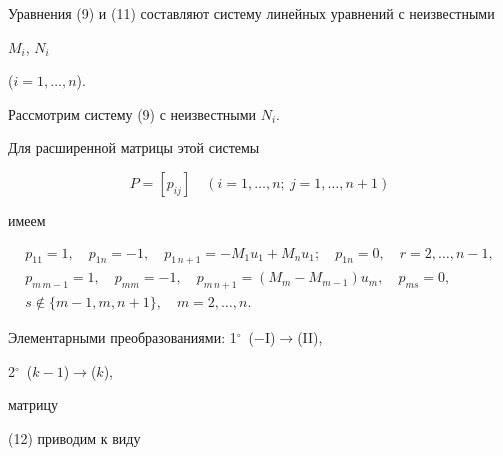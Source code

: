 Уравнения (9) и (11) составляют систему линейных уравнений с неизвестными


$M_i$, $N_i$\linebreak %


($i=1,\dotsc,n$).





Рассмотрим систему (9) с неизвестными $N_i$.


Для расширенной матрицы этой системы


\begin{equation}


P=[p_{ij}]\quad (i=1,\dotsc,n; \ j=1,\dotsc,n+1)


\end{equation}


имеем


\begin{gather*}


p_{11}=1,\quad p_{1n}=-1,\quad p_{1\,n+1}=-M_1u_1+M_nu_1;\quad


p_{1n}=0,\quad r=2,\dotsc,n-1,\\


p_{m\,m-1}=1,\quad p_{mm}=-1,\quad p_{m\,n+1}=(M_m-M_{m-1})u_m,


\quad p_{ms}=0,\\


s\notin\{m-1,m,n+1\},\quad m=2,\dotsc,n.


\end{gather*}


Элементарными преобразованиями: 1${}^\circ$~($-$I)$\to$(II),


2${}^\circ$~($k-1$)$\to$($k$),


матрицу


(12) приводим к виду


